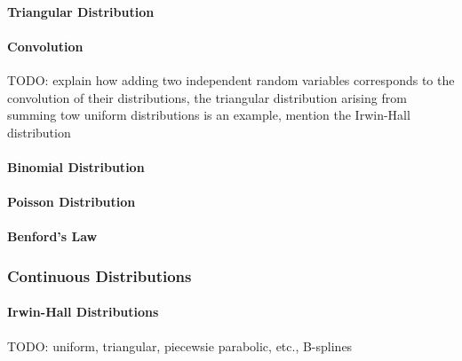 \paragraph{Triangular Distribution}

\paragraph{Convolution} TODO: explain how adding two independent random variables corresponds to the convolution of their distributions, the triangular distribution arising from summing tow uniform distributions is an example, mention the Irwin-Hall distribution



\paragraph{Binomial Distribution}


\paragraph{Poisson Distribution}


\paragraph{Benford's Law}




\subsubsection{Continuous Distributions}

\paragraph{Irwin-Hall Distributions} TODO: uniform, triangular, piecewsie parabolic, etc., B-splines

